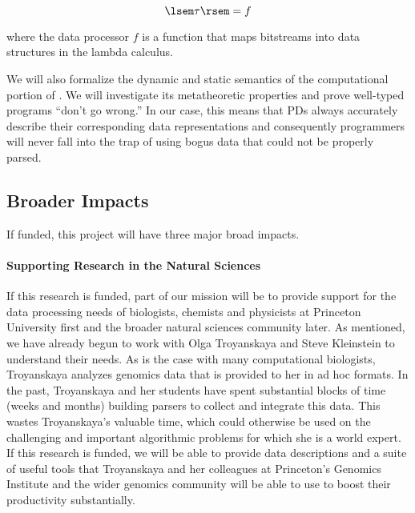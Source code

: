 \documentclass[11pt]{article}
\begin{document}
\[
\lsem \tau \rsem = f
\]

\noindent
where the data processor $f$ is a function that maps bitstreams into 
data structures in the lambda calculus. 

We will also formalize the dynamic and static semantics of the 
computational portion of \datatype.  We will investigate
its metatheoretic properties and prove well-typed programs 
``don't go wrong.''  In our case, this means that PDs always
accurately describe their corresponding data representations and
consequently programmers
will never fall into the trap of using bogus data that could not be 
properly parsed.


\subsection{Broader Impacts}
\label{ssec:impact}

If funded, this project will have three major broad impacts.

\paragraph*{Supporting Research in the Natural Sciences}
If this research is funded, part of our mission will be
to provide support for the data processing needs of biologists,
chemists and physicists at Princeton University first and 
the broader natural sciences community later.  As mentioned,
we have already begun to work with Olga Troyanskaya
and Steve Kleinstein to understand their needs.
As is the case with many computational biologists,
Troyanskaya analyzes genomics data that is provided to her in ad hoc
formats.  In the past, Troyanskaya and her students have spent
substantial blocks of time (weeks and months)
building parsers to collect and integrate
this data.  This wastes Troyanskaya's valuable time, which could otherwise be
used on the challenging and important algorithmic problems for which
she is a world expert.
If this research is
funded, we will be able to provide data descriptions and
a suite of useful tools that Troyanskaya
and her colleagues at Princeton's Genomics Institute and the wider
genomics community will be able to use to boost their productivity
substantially.  

\end{document}
